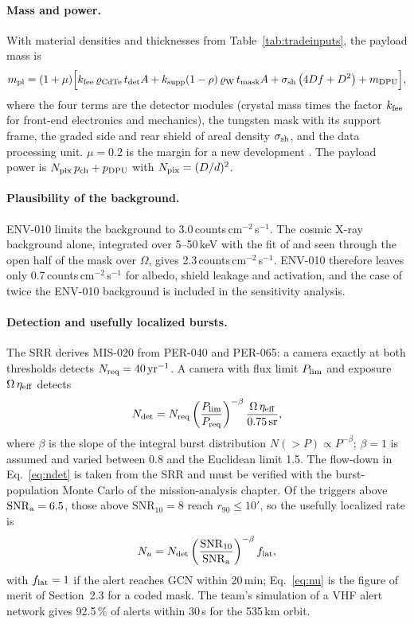 \paragraph{Mass and power.} With material densities and thicknesses from
Table~\ref{tab:tradeinputs}, the payload mass is
\begin{equation}\label{eq:mass}
m_{\rm pl} = (1+\mu)\Big[k_{\rm fee}\,\varrho_{\rm CdTe}\,t_{\rm det}A
 + k_{\rm supp}(1-\rho)\,\varrho_{\rm W}\,t_{\rm mask}A
 + \sigma_{\rm sh}\left(4Df+D^2\right) + m_{\rm DPU}\Big],
\end{equation}
where the four terms are the detector modules (crystal mass times the factor $k_{\rm fee}$
for front-end electronics and mechanics), the tungsten mask with its support frame, the
graded side and rear shield of areal density $\sigma_{\rm sh}$, and the data processing
unit. $\mu=0.2$ is the margin for a new development \cite{ESAmargin}. The payload power is
$N_{\rm pix}\,p_{\rm ch}+p_{\rm DPU}$ with $N_{\rm pix}=(D/d)^2$.

\paragraph{Plausibility of the background.} ENV-010 limits the background to
3.0\,counts\,cm$^{-2}$\,s$^{-1}$. The cosmic X-ray background alone, integrated over
5--50\,keV with the fit of \cite{Gruber1999} and seen through the open half of the mask
over $\Omega$, gives 2.3\,counts\,cm$^{-2}$\,s$^{-1}$. ENV-010 therefore leaves only
0.7\,counts\,cm$^{-2}$\,s$^{-1}$ for albedo, shield leakage and activation, and the case of
twice the ENV-010 background is included in the sensitivity analysis.

\paragraph{Detection and usefully localized bursts.} The SRR derives MIS-020 from PER-040 and
PER-065: a camera exactly at both thresholds detects $N_{\rm req}=40\,\mathrm{yr^{-1}}$.
A camera with flux limit $P_{\rm lim}$ and exposure $\Omega\,\eta_{\rm eff}$ detects
\begin{equation}\label{eq:ndet}
N_{\rm det}=N_{\rm req}\left(\frac{P_{\rm lim}}{P_{\rm req}}\right)^{-\beta}
\frac{\Omega\,\eta_{\rm eff}}{0.75\,\mathrm{sr}},
\end{equation}
where $\beta$ is the slope of the integral burst distribution $N(>P)\propto P^{-\beta}$;
$\beta=1$ is assumed and varied between 0.8 and the Euclidean limit 1.5. The flow-down in
Eq.~\eqref{eq:ndet} is
taken from the SRR and must be verified with the burst-population Monte Carlo of the
mission-analysis chapter. Of the triggers above $\mathrm{SNR}_{\rm a}=6.5$, those above
$\mathrm{SNR}_{10}=8$ reach $r_{90}\le10'$, so the usefully localized rate is
\begin{equation}\label{eq:nu}
N_u = N_{\rm det}\left(\frac{\mathrm{SNR}_{10}}{\mathrm{SNR}_{\rm a}}\right)^{-\beta} f_{\rm lat},
\end{equation}
with $f_{\rm lat}=1$ if the alert reaches GCN within 20\,min; Eq.~\eqref{eq:nu} is the figure
of merit of Section~2.3 for a coded mask. The team's simulation of a
VHF alert network gives 92.5\,\% of alerts within 30\,s for the 535\,km orbit.

